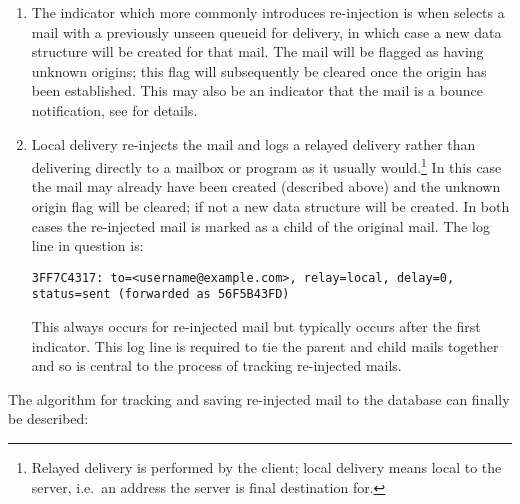 \begin{enumerate}

    \item The indicator which more commonly introduces re-injection is when
         selects a mail with a previously unseen queueid for
        delivery, in which case a new data structure will be created for
        that mail.  The mail will be flagged as having unknown origins;
        this flag will subsequently be cleared once the origin has been
        established.  This may also be an indicator that the mail is a
        bounce notification, see  for details.

    \item Local delivery re-injects the mail and logs a relayed delivery
        rather than delivering directly to a mailbox or program as it
        usually would.\footnote{Relayed delivery is performed by the
         client; local delivery means local to the server,
        i.e.\ an address the server is final destination for.}  In this
        case the mail may already have been created (described above) and
        the unknown origin flag will be cleared; if not a new data
        structure will be created.  In both cases the re-injected mail is
        marked as a child of the original mail.  The log line in question
        is:

        \texttt{3FF7C4317: to=<username@example.com>, relay=local,
        \newline{} \tab{} delay=0, status=sent (forwarded as 56F5B43FD)}

        This always occurs for re-injected mail but typically occurs after
        the first indicator.  This log line is required to tie the parent
        and child mails together and so is central to the process of
        tracking re-injected mails.

\end{enumerate}

The algorithm for tracking and saving re-injected mail to the database can
finally be described:


